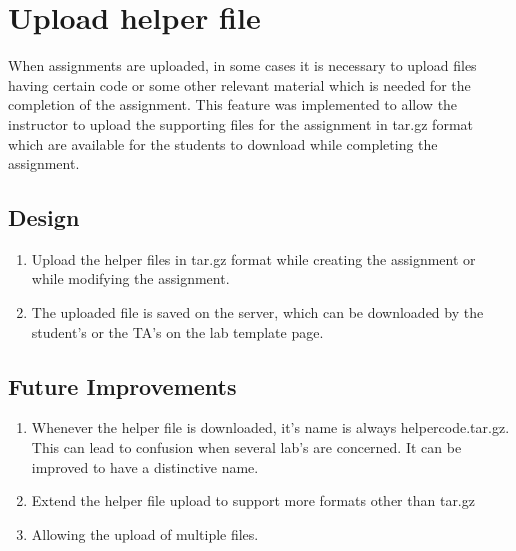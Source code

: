 \section{Upload helper file}
When assignments are uploaded, in some cases it is necessary to upload files having certain code or some other relevant material which is needed for the completion of the assignment. This feature was implemented to allow the instructor to upload the supporting files for the assignment in tar.gz format which are available for the students to download while completing the assignment.

\subsection{Design}
\begin{enumerate}
\item Upload the helper files in tar.gz format while creating the assignment or while modifying the assignment.
\item The uploaded file is saved on the server, which can be downloaded by the student's or the TA's on the lab template page.
\end{enumerate}

\subsection{Future Improvements}
\begin{enumerate}
\item Whenever the helper file is downloaded, it's name is always helpercode.tar.gz. This can lead to confusion when several lab's are concerned. It can be improved to have a distinctive name.
\item Extend the helper file upload to support more formats other than tar.gz
\item Allowing the upload of multiple files.
\end{enumerate}
